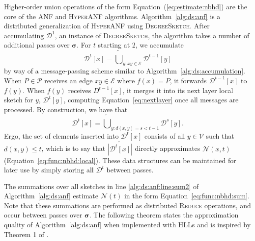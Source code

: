 \documentclass{vldb}
\newcommand{\algoname}[1]{\textnormal{\textsc{#1}}}
\begin{document}
Higher-order union operations of the form Equation~(\ref{eq:estimate:nbhd}) are the core of the \algoname{ANF} \cite{palmer2002anf} and \algoname{HyperANF} \cite{boldi2011hyperanf} algorithms.
Algorithm~\ref{alg:ds:anf} is a distributed generalization of \algoname{HyperANF} using \algoname{DegreeSketch}.
After accumulating $\mathcal{D}^1$, an instance of \algoname{DegreeSketch}, the algorithm takes a number of additional passes over $\boldsymbol{\sigma}$. 
For $t$ starting at 2, we accumulate 
%
\begin{equation} \label{eq:nextlayer}
\mathcal{D}^t[x] = \widetilde{\bigcup}_{y: xy \in \mathcal{E}} \mathcal{D}^{t-1}[y]
\end{equation}
%
by way of a message-passing scheme similar to Algorithm~\ref{alg:ds:accumulation}.
When $P \in \mathcal{P}$ receives an edge $xy \in \mathcal{E}$ where $f(x) = P$, it forwards $\mathcal{D}^{t-1}[x]$ to $f(y)$.
When $f(y)$ receives $D^{t-1}[x]$, it merges it into its next layer local sketch for $y$, $\mathcal{D}^t[y]$, computing Equation~\eqref{eq:nextlayer} once all messages are processed.
By construction, we have that
%
\begin{equation} \label{eq:nextlayer:full}
\mathcal{D}^t[x] = \widetilde{\bigcup}_{y: d(x,y) = s < t-1} \mathcal{D}^{s}[y].
\end{equation}
%
Ergo, the set of elements inserted into $\mathcal{D}^t[x]$ consists of all $y \in \mathcal{V}$ such that $d(x,y) \leq t$, which is to say that $\widetilde{|\mathcal{D}^t[x]|}$ directly approximates $\mathcal{N}(x, t)$ (Equation~\eqref{eq:func:nbhd:local}). 
These data structures can be maintained for later use by simply storing all $\mathcal{D}^t$ between passes.

The summations over all sketches in line 
\ref{alg:ds:anf:line:sum2} of Algorithm~\ref{alg:ds:anf} estimate $\mathcal{N}(t)$ in the form Equation~\ref{eq:func:nbhd:sum}.
Note that these summations are performed as distributed \algoname{Reduce} operations, and occur between passes over $\mathbf{\sigma}$.
The following theorem states the approximation quality of Algorithm~\ref{alg:ds:anf} when implemented with HLLs and is inspired by Theorem 1 of \cite{boldi2011hyperanf}.
\end{document}

